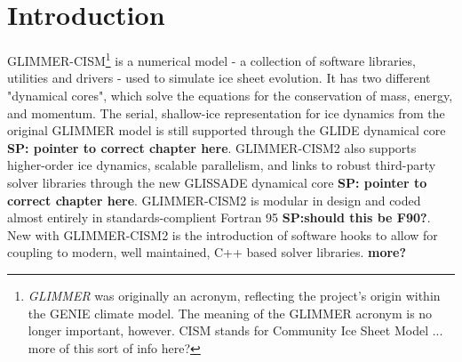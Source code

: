 
\section{Introduction}
%
GLIMMER-CISM\footnote{{\it GLIMMER} was originally an acronym, reflecting the project's origin within the GENIE climate model. The meaning of the GLIMMER acronym is no longer important, however. CISM stands for Community Ice Sheet Model ... more of this sort of info here?} is a numerical model - a collection of software libraries, utilities and drivers  - used to simulate ice sheet evolution. It has two different "dynamical cores", which solve the equations for the conservation of mass, energy, and momentum. The serial, shallow-ice representation for ice dynamics from the original GLIMMER model is still supported through the GLIDE dynamical core \textbf{SP: pointer to correct chapter here}. GLIMMER-CISM2 also supports higher-order ice dynamics, scalable parallelism, and links to robust third-party solver libraries through the new GLISSADE dynamical core \textbf{SP: pointer to correct chapter here}. GLIMMER-CISM2 is modular in design and coded almost entirely in standards-complient Fortran 95 \textbf{SP:should this be F90?}. New with GLIMMER-CISM2 is the introduction of software hooks to allow for coupling to modern, well maintained, C++ based solver libraries. \textbf{more?}
%
